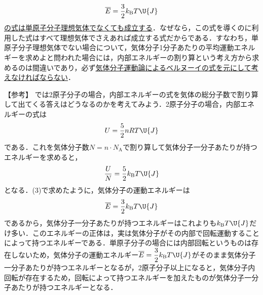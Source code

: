 \begin{multicols}{2}
\begin{chuu}
\[\overline{E}=\frac{3}{2}k_{\mathrm{B}}T\U{J}\]
\underline{の式は}\hskip0pt\underline{単原子}\hskip0pt\underline{分子理}\hskip0pt\underline{想気体}\hskip0pt\underline{でなく}\hskip0pt\underline{ても成}\hskip0pt\underline{立する}．なぜなら，この式を導くのに利用した式はすべて理想気体でさえあれば成立する式だからである．すなわち，単原子分子理想気体でない場合について，気体分子1分子あたりの平均運動エネルギーを求めよと問われた場合には，内部エネルギーの割り算という考え方から求めるのは間違いであり，必ず\underline{気体分}\hskip0pt\underline{子運動}\hskip0pt\underline{論によ}\hskip0pt\underline{るベル}\hskip0pt\underline{ヌーイ}\hskip0pt\underline{の式を}\hskip0pt\underline{元にし}\hskip0pt\underline{て考え}\hskip0pt\underline{なけれ}\hskip0pt\underline{ばなら}\hskip0pt\underline{ない}．
\end{chuu}
\begin{itembox}[l]{【参考】}
では2原子分子の場合，内部エネルギーの式を気体の総分子数で割り算して出てくる答えはどうなるのかを考えてみよう．2原子分子の場合，内部エネルギーの式は
\[U=\frac{5}{2}nRT\U{J}\]
である．これを気体分子数$N=n\cdot N_{\mathrm{A}}$で割り算して気体分子一分子あたりが持つエネルギーを求めると，
\[\frac{U}{N}=\frac{5}{2}k_{\mathrm{B}}T\U{J}\]
となる．(3)で求めたように，気体分子の運動エネルギーは
\[\overline{E}=\frac{3}{2}k_{\mathrm{B}}T\U{J}\]
であるから，気体分子一分子あたりが持つエネルギーはこれよりも$k_{\mathrm{B}}T\U{J}$だけ多い．このエネルギーの正体は，実は気体分子がその内部で回転運動することによって持つエネルギーである．単原子分子の場合には内部回転というものは存在しないため，気体分子の運動エネルギー$\overline{E}=\dfrac{3}{2}k_{\mathrm{B}}T\U{J}$がそのまま気体分子一分子あたりが持つエネルギーとなるが，2原子分子以上になると，気体分子内回転が存在するため，回転によって持つエネルギーを加えたものが気体分子一分子あたりが持つエネルギーとなる．
\end{itembox}


\end{multicols}
